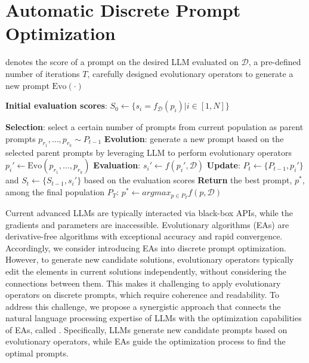 




\section{Automatic Discrete Prompt Optimization}
\begin{algorithm}
\caption{Discrete prompt optimization: \modelname}  
\label{alg:evo}
\begin{algorithmic}[1]
 denotes the score of a prompt on the desired LLM evaluated on $\mathcal D$, a pre-defined number of iterations $T$, carefully designed evolutionary operators to generate a new prompt $\text{Evo}(\cdot)$

\State \textbf{Initial evaluation scores}: $S_0\leftarrow\{s_i=f_\mathcal D(p_i)| i\in[1,N]\}$

    \State \textbf{Selection}: select a certain number of prompts from current population as parent prompts $p_{r_1},\dots,p_{r_k}  \sim P_{t-1}$ 
    \State \textbf{Evolution}: generate a new prompt based on the selected parent prompts by leveraging LLM to perform evolutionary operators $p_i' \leftarrow \text{Evo}(p_{r_1},\dots,p_{r_k})$
    \State \textbf{Evaluation}: $s_i'\leftarrow f(p_i', \mathcal D)$
    \State \textbf{Update}: $P_t\leftarrow \{P_{t-1}, p_i'\}$ and $S_t\leftarrow \{S_{t-1}, s_i'\}$ based on the evaluation scores
\EndFor
\State \textbf{Return} the best prompt, $p^*$, among the final population $P_T$: $p^*\leftarrow argmax_{p \in P_T} f(p, \mathcal D)$

\end{algorithmic}
\end{algorithm} 
Current advanced LLMs are typically interacted via black-box APIs, while the gradients and parameters are inaccessible. Evolutionary algorithms (EAs) are derivative-free algorithms with exceptional accuracy and rapid convergence. Accordingly, we consider introducing EAs into discrete prompt optimization. However, to generate new candidate solutions, evolutionary operators typically edit the elements in current solutions independently, without considering the connections between them. This makes it challenging to apply evolutionary operators on discrete prompts, which require coherence and readability. To address this challenge, we propose a synergistic approach that connects the natural language processing expertise of LLMs with the optimization capabilities of EAs, called \modelname. 
Specifically, LLMs generate new candidate prompts based on evolutionary operators, while EAs guide the optimization process to find the optimal prompts.

